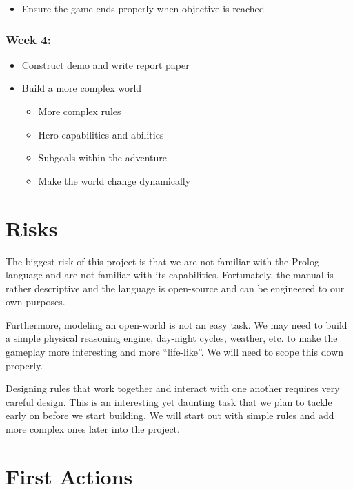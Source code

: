 \documentclass[10pt]{article}
\begin{document}
\begin{itemize}
\item Ensure the game ends properly when objective is reached
\end{itemize}


\subsubsection*{Week 4:}

\begin{itemize}
\item Construct demo and write report paper
\item Build a more complex world
    \begin{itemize}
    \item More complex rules
    \item Hero capabilities and abilities
    \item Subgoals within the adventure
    \item Make the world change dynamically
    \end{itemize}
\end{itemize}



\section*{Risks}

The biggest risk of this project is that we are not familiar with the Prolog language and are not familiar with its capabilities. Fortunately, the manual is rather descriptive and the language is open-source and can be engineered to our own purposes.

Furthermore, modeling an open-world is not an easy task. We may need to build a simple physical reasoning engine, day-night cycles, weather, etc. to make the gameplay more interesting and more “life-like”. We will need to scope this down properly.

Designing rules that work together and interact with one another requires very careful design. This is an interesting yet daunting task that we plan to tackle early on before we start building. We will start out with simple rules and add more complex ones later into the project.


\section*{First Actions}
\end{document}

